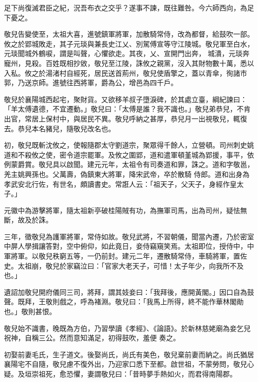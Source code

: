 \begin{pinyinscope}
 足下尚復滅君臣之紀，況吾布衣之交乎？遂事不諫，既往難咎。今六師西向，為足下憂之。



 敬兒告變使至，太祖大喜，進號鎮軍將軍，加散騎常侍，改為都督，給鼓吹一部。攸之於郢城敗走，其子元琰與兼長史江乂、別駕傅宣等守江陵城。敬兒軍至白水，元琰聞城外鶴唳，謂是叫聲，心懼欲走。其夜，乂、宣開門出奔，
 城潰，元琰奔寵州，見殺。百姓既相抄敓，敬兒至江陵，誅攸之親黨，沒入其財物數十萬，悉以入私。攸之於湯渚村自經死，居民送首荊州，敬兒使盾擎之，蓋以青傘，徇諸市郭，乃送京師。進號往西將軍，爵為公，增邑為四千戶。



 敬兒於襄陽城西起宅，聚財貨。又欲移羊叔子墮淚碑，於其處立臺，綱紀諫曰：「羊太傅遺德，不宜遷動。」敬兒曰：「太傅是誰？我不識也。」敬兒弟恭兒，不肯出官，常居上保村中，與居民不異。敬兒呼納之甚厚，恭兒月一出視敬兒，輒復去。恭兒本名豬兒，隨敬兒改名也。



 初，敬兒既斬沈攸之，使報隨郡太守劉道宗，聚眾得千餘人，立營頓。司州刺史姚道和不殺攸之使，密令道宗罷軍。及攸之圍郢，道和遣軍頓堇城為郢援，事平，依例蒙爵賞。敬兒具以啟聞。建元元年，太祖令有司奏道和罪，誅之。道和字敬邕，羌主姚興孫也。父萬壽，偽鎮東大將軍，降宋武帝，卒於散騎
 侍郎。道和出身為孝武安北行佐，有世名，頗讀書史。常誑人云：「祖天子，父天子，身經作皇太子。」



 元徽中為游擊將軍，隨太祖新亭破桂陽賊有功，為撫軍司馬，出為司州，疑怯無斷，故及於誅。



 三年，徵敬兒為護軍將軍，常侍如故。敬兒武將，不習朝儀，聞當內遷，乃於密室中屏人學揖讓答對，空中俯仰，如此竟日，妾侍竊窺笑焉。太祖即位，授侍中，中軍將軍。以敬兒秩窮五等，一仍前封。建元二年，遷散騎常侍，車騎將軍，置佐史。太祖崩，敬兒於家竊泣曰：「官家大老天子，可惜！太子年少，向我所不及也。」



 遺詔加敬兒開府儀同三司，將拜，謂其妓妾曰：「我拜後，應開黃閣。」因口自為鼓聲。既拜，王敬則戲之，呼為褚淵。敬兒曰：「我馬上所得，終不能作華林閣勛也。」敬則甚恨。



 敬兒始不識書，晚既為方伯，乃習學讀《孝經》、《論語》。於新林慈姥廟為妾乞兒祝神，自稱三公。然而意知滿足，初得鼓吹，羞便
 奏之。



 初娶前妻毛氏，生子道文。後娶尚氏，尚氏有美色，敬兒棄前妻而納之。尚氏猶居襄陽宅不自隨，敬兒慮不復外出，乃迎家口悉下至都。啟世祖，不蒙勞問，敬兒心疑。及垣崇祖死，愈恐懼，妻謂敬兒曰：「昔時夢手熱如火，而君得南陽郡。




\end{pinyinscope}

